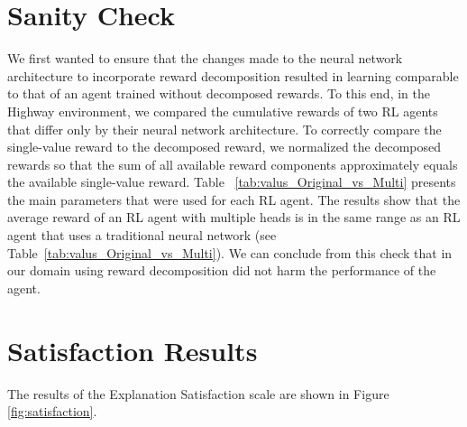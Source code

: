 
\section{Sanity Check}
We first wanted to ensure that the changes made to the neural network architecture to incorporate reward decomposition resulted in learning comparable to that of an agent trained without decomposed rewards. To this end, in the Highway environment, we compared the cumulative rewards of two RL agents that differ only by their neural network architecture. To correctly compare the single-value reward to the decomposed reward, we normalized the decomposed rewards so that the sum of all available reward components approximately equals the available single-value reward. Table ~\ref{tab:valus_Original_vs_Multi} presents the main parameters that were used for each RL agent.
The results show that the average reward of an RL agent with multiple heads is in the same range as an RL agent that uses a traditional neural network (see Table~\ref{tab:valus_Original_vs_Multi}).
We can conclude from this check that in our domain using reward decomposition did not harm the performance of the agent.



\section {Satisfaction Results}


The results of the Explanation Satisfaction scale are shown in Figure \ref{fig:satisfaction}. 

